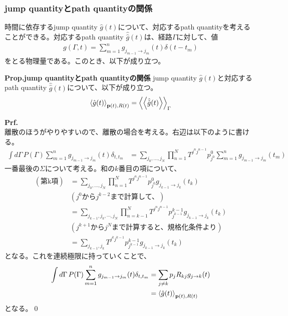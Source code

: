 \documentclass[a4paper,11pt]{jsarticle}
\numberwithin{equation}{section}
\begin{document}
\subsubsection{jump quantityとpath quantityの関係}
時間に依存するjump quantity $\hat{g}(t)$について、対応するpath quantityを考えることができる。対応するpath quantity $\hat{\hat{g}}(t)$は、経路$\Gamma$に対して、値
\begin{align}
    g(\Gamma,t) = \sum_{m=1}^{n} g_{j_{m-1} \to j_{m}}(t) \delta(t-t_{m})
\end{align}
をとる物理量である。このとき、以下が成り立つ。
\begin{itembox}[l]{\textbf{Prop.jump quantityとpath quantityの関係}}
    jump quantity $\hat{g}(t)$と対応するpath quantity $\hat{\hat{g}}(t)$について、以下が成り立つ。
    \begin{align}
        \ev{\hat{g}(t)}_{\vb{p}(t),R(t)} = \ev{\ev{\hat{\hat{g}}(t)}}_{\Gamma}
    \end{align}
\end{itembox}
\textbf{Prf.}\\
離散のほうがやりやすいので、離散の場合を考える。右辺は以下のように書ける。
\begin{align}
    \int d\Gamma \, P(\Gamma) \sum_{m=1}^{n} g_{j_{m-1} \to j_{m}}(t) \delta_{t,t_m}
    &= \sum_{j_0, \dots, j_N} \prod_{n=1}^N T^{j^n j^{n-1}} p^0_{j^0} 
    \sum_{m=1}^{n} g_{j_{m-1} \to j_{m}}(t_m) 
\end{align}
一番最後の$\Sigma$について考える。和の$k$番目の項について、
\begin{align}
    (\text{第k項}) &= \sum_{j_0, \dots, j_N} \prod_{n=1}^N T^{j^n j^{n-1}} p^0_{j^0} g_{j_{k-1} \to j_{k}}(t_k) \\
    &(j^{0}\text{から}j^{k-2}\text{まで計算して、}) \nonumber \\
    &= \sum_{j_{k-1}, j_k, \cdots, j_N} \prod_{n=k-1}^N T^{j^n j^{n-1}} p^{k-1}_{j^{k-1}} g_{j_{k-1} \to j_{k}}(t_k) \\
    &(j^{k+1}\text{から}j^{N}\text{まで計算すると、規格化条件より}) \nonumber \\
    &= \sum_{j_{k-1}, j_k} T^{j^k j^{k-1}} p^{k-1}_{j^{k-1}} g_{j_{k-1} \to j_{k}}(t_k)
\end{align}
となる。これを連続極限に持っていくことで、
\begin{align}
    \int d\Gamma \, P(\Gamma) \sum_{m=1}^{n} g_{j_{m-1} \to j_{m}}(t) \delta_{t,t_m}
    &= \sum_{j\neq k} p_{j} R_{kj} g_{j \to k}(t)\\
    &= \ev{\hat{g}(t)}_{\vb{p}(t), R(t)}
\end{align}
となる。\qed
\end{document}
